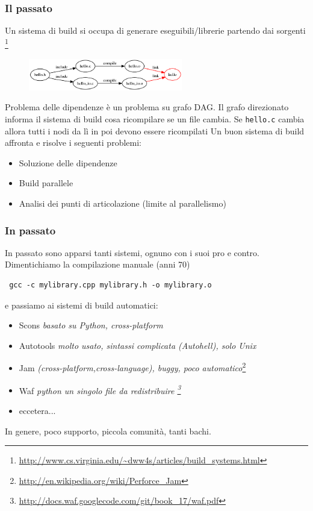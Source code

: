 \documentclass[10pt] {beamer}
\begin{document}
\begin{frame}
\frametitle{Il passato}
Un sistema di build si occupa di generare eseguibili/librerie partendo dai sorgenti \footnote{\url{http://www.cs.virginia.edu/~dww4s/articles/build_systems.html}}
\begin{figure}[htb]
 \centering
 \includegraphics[width=0.6\textwidth]{hello_digraph.png}
\end{figure}
Problema delle dipendenze è un problema su grafo DAG. Il grafo direzionato informa il sistema di build cosa ricompilare se un file cambia. Se \texttt{hello.c} cambia allora tutti i nodi da lì in poi devono essere ricompilati
Un buon sistema di build affronta e risolve i seguenti problemi:
\begin{itemize}
\item Soluzione delle dipendenze 
\item Build parallele
\item Analisi dei punti di articolazione (limite al parallelismo)
\end{itemize}
\end{frame}

\begin{frame}[fragile]
\frametitle{In passato}
In passato sono apparsi tanti sistemi, ognuno con i suoi pro e contro. Dimentichiamo la compilazione manuale (anni 70)
\begin{verbatim}
 gcc -c mylibrary.cpp mylibrary.h -o mylibrary.o
\end{verbatim}
e passiamo ai sistemi di build automatici:

\begin{itemize}
\item<1-> Scons \textit{basato su Python, cross-platform}
\item<2-> Autotools \textit{ molto usato, sintassi complicata (Autohell), solo Unix }
\item<3-> Jam \textit{ (cross-platform,cross-language), buggy, poco automatico}\footnote{\url{http://en.wikipedia.org/wiki/Perforce_Jam}}
\item<4-> Waf \textit{ python un singolo file da redistribuire \footnote{\url{http://docs.waf.googlecode.com/git/book_17/waf.pdf}}}
\item<5-> eccetera...
\end{itemize}
In genere, poco supporto, piccola comunità, tanti bachi.
\end{frame}
\end{document}
